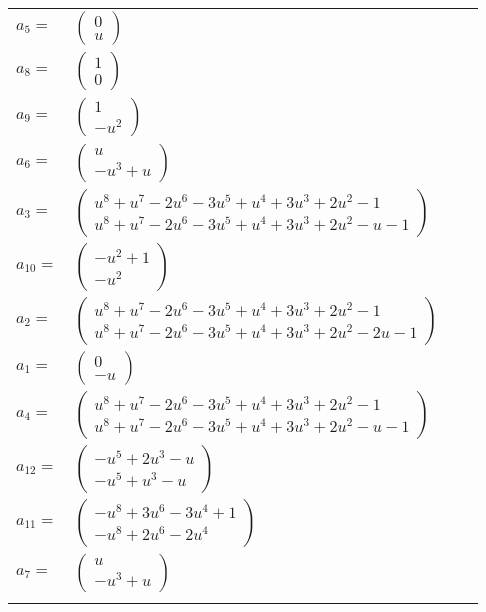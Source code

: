 \documentclass[1p]{elsarticle_modified}
\theoremstyle{definition}
\begin{document}
\begin{tabular}{m{7pt} m{180pt} m{7pt} m{180pt} }
\flushright $a_{5}=$&$\begin{pmatrix}0\\u\end{pmatrix}$ \\
\flushright $a_{8}=$&$\begin{pmatrix}1\\0\end{pmatrix}$ \\
\flushright $a_{9}=$&$\begin{pmatrix}1\\- u^2\end{pmatrix}$ \\
\flushright $a_{6}=$&$\begin{pmatrix}u\\- u^3+u\end{pmatrix}$ \\
\flushright $a_{3}=$&$\begin{pmatrix}u^8+u^7-2 u^6-3 u^5+u^4+3 u^3+2 u^2-1\\u^8+u^7-2 u^6-3 u^5+u^4+3 u^3+2 u^2- u-1\end{pmatrix}$ \\
\flushright $a_{10}=$&$\begin{pmatrix}- u^2+1\\- u^2\end{pmatrix}$ \\
\flushright $a_{2}=$&$\begin{pmatrix}u^8+u^7-2 u^6-3 u^5+u^4+3 u^3+2 u^2-1\\u^8+u^7-2 u^6-3 u^5+u^4+3 u^3+2 u^2-2 u-1\end{pmatrix}$ \\
\flushright $a_{1}=$&$\begin{pmatrix}0\\- u\end{pmatrix}$ \\
\flushright $a_{4}=$&$\begin{pmatrix}u^8+u^7-2 u^6-3 u^5+u^4+3 u^3+2 u^2-1\\u^8+u^7-2 u^6-3 u^5+u^4+3 u^3+2 u^2- u-1\end{pmatrix}$ \\
\flushright $a_{12}=$&$\begin{pmatrix}- u^5+2 u^3- u\\- u^5+u^3- u\end{pmatrix}$ \\
\flushright $a_{11}=$&$\begin{pmatrix}- u^8+3 u^6-3 u^4+1\\- u^8+2 u^6-2 u^4\end{pmatrix}$ \\
\flushright $a_{7}=$&$\begin{pmatrix}u\\- u^3+u\end{pmatrix}$\\&\end{tabular}
\end{document}
